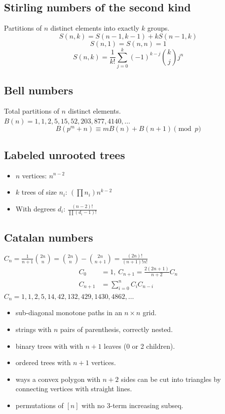 	\subsection{Stirling numbers of the second kind}
		Partitions of $n$ distinct elements into exactly $k$ groups.
		$$S(n,k) = S(n-1,k-1) + k S(n-1,k)$$
		$$S(n,1) = S(n,n) = 1$$
		$$S(n,k) = \frac{1}{k!}\sum_{j=0}^k (-1)^{k-j}\binom{k}{j}j^n$$

  \subsection{Bell numbers}
  \raggedright
  Total partitions of $n$ distinct elements. \\
  {\tiny $B(n) = 1, 1, 2, 5, 15, 52, 203, 877, 4140, \dots$}
  \[ B(p^m+n)\equiv mB(n)+B(n+1) \pmod{p} \]

  \subsection{Labeled unrooted trees}
  \begin{itemize}[leftmargin=*, noitemsep, topsep=0pt]
    \item $n$ vertices: $n^{n-2}$
    \item $k$ trees of size $n_i$: $(\prod n_i) n^{k-2}$
    \item With degrees $d_i$: $\frac{(n-2)!}{\prod (d_i-1)!}$
  \end{itemize}

  \subsection{Catalan numbers}
  \raggedright
  $C_n = \frac{1}{n+1}\binom{2n}{n} = \binom{2n}{n}-\binom{2n}{n+1} = \frac{(2n)!}{(n+1)!n!}$
  \begin{align*}
    C_0 &= 1,\ C_{n+1} = \frac{2(2n+1)}{n+2}C_n \\
    C_{n+1} &= \textstyle \sum_{i=0}^n C_iC_{n-i}
  \end{align*}
  {\tiny $C_n = 1, 1, 2, 5, 14, 42, 132, 429, 1430, 4862, \dots$}

		\begin{itemize}[noitemsep]
			\item sub-diagonal monotone paths in an $n\times n$ grid.
			\item strings with $n$ pairs of parenthesis, correctly nested.
			\item binary trees with with $n+1$ leaves (0 or 2 children).
			\item ordered trees with $n+1$ vertices.
			\item ways a convex polygon with $n+2$ sides can be cut into triangles by connecting vertices with straight lines.
			\item permutations of $[n]$ with no 3-term increasing subseq.
		\end{itemize}